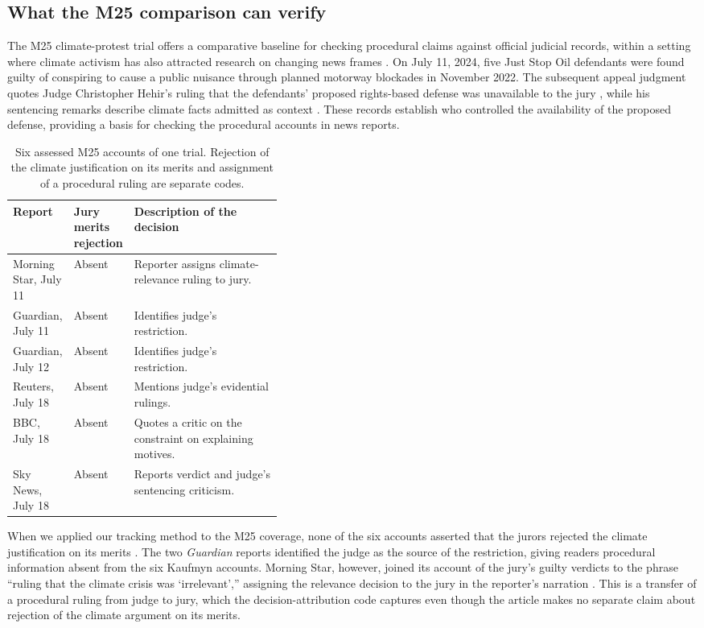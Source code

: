 \documentclass[11pt]{article}
\begin{document}
\subsection{What the M25 comparison can verify}
\label{sec:m25}
The M25 climate-protest trial offers a comparative baseline for checking procedural claims against official judicial records, within a setting where climate activism has also attracted research on changing news frames \citep{cappelli}. On July 11, 2024, five Just Stop Oil defendants were found guilty of conspiring to cause a public nuisance through planned motorway blockades in November 2022. The subsequent appeal judgment quotes Judge Christopher Hehir's ruling that the defendants' proposed rights-based defense was unavailable to the jury \citep[paras.~52--55]{hallam}, while his sentencing remarks describe climate facts admitted as context \citep[paras.~39--40]{hehirremarks}. These records establish who controlled the availability of the proposed defense, providing a basis for checking the procedural accounts in news reports.

\begin{table}[!htbp]
\centering\small
\begin{tabularx}{\textwidth}{P{0.20\linewidth} P{0.19\linewidth} Y}
\toprule Report & Jury merits rejection & Description of the decision\\\midrule
Morning Star, July 11 & Absent & Reporter assigns climate-relevance ruling to jury.\\
Guardian, July 11 & Absent & Identifies judge's restriction.\\
Guardian, July 12 & Absent & Identifies judge's restriction.\\
Reuters, July 18 & Absent & Mentions judge's evidential rulings.\\
BBC, July 18 & Absent & Quotes a critic on the constraint on explaining motives.\\
Sky News, July 18 & Absent & Reports verdict and judge's sentencing criticism.\\
\bottomrule
\end{tabularx}
\caption{Six assessed M25 accounts of one trial. Rejection of the climate justification on its merits and assignment of a procedural ruling are separate codes.}
\label{tab:m25}
\end{table}

When we applied our tracking method to the M25 coverage, none of the six accounts asserted that the jurors rejected the climate justification on its merits \citep{gayleverdict,gaylefeature,tobin,bbc,sky,morningstar}. The two \textit{Guardian} reports identified the judge as the source of the restriction, giving readers procedural information absent from the six Kaufmyn accounts. Morning Star, however, joined its account of the jury's guilty verdicts to the phrase ``ruling that the climate crisis was `irrelevant','' assigning the relevance decision to the jury in the reporter's narration \citep{morningstar}. This is a transfer of a procedural ruling from judge to jury, which the decision-attribution code captures even though the article makes no separate claim about rejection of the climate argument on its merits.
\end{document}
